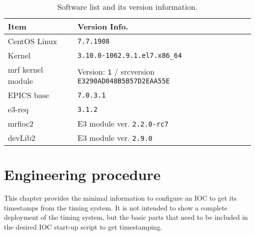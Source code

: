\documentclass[11pt
  , a4paper
  , article
  , oneside
  , showtrims
]{memoir}
\begin{document}
\begin{table}[!htb]
  \centering
  \begin{tabular}{l|l}
    \toprule
    Item               & Version Info.                                                      \\\midrule
    CentOS Linux       & \texttt{7.7.1908}                                                  \\\midrule
    Kernel             & \texttt{3.10.0-1062.9.1.el7.x86\_64}                               \\\midrule
    mrf kernel module  & Version: \texttt{1} / srcversion \texttt{E3290AD048B5B57D2EAA55E}  \\\midrule
    EPICS base         & \texttt{7.0.3.1}                                                   \\\midrule
    e3-req             & \texttt{3.1.2}                                                     \\\midrule
    mrfioc2            & E3 module ver. \texttt{2.2.0-rc7}                                  \\\midrule
    devLib2            & E3 module ver. \texttt{2.9.0}                                      \\\bottomrule
  \end{tabular}
  \caption[]{Software list and its version information.}
  \label{table:swlist}
\end{table}



\chapter{Engineering procedure}
This chapter provides the minimal information to configure an IOC to get its timestamps from the timing system. It is not intended to show a complete deployment of the timing system, but the basic parts that need to be included in the desired IOC start-up script to get timestamping.\\
\end{document}
